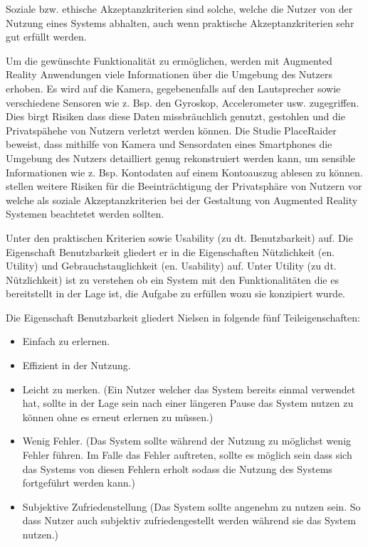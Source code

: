 Soziale bzw. ethische Akzeptanzkriterien sind solche, welche die Nutzer von der Nutzung eines Systems abhalten, auch wenn praktische Akzeptanzkriterien sehr gut erfüllt werden. 

Um die gewünschte Funktionalität zu ermöglichen, werden mit Augmented Reality Anwendungen viele Informationen über die Umgebung des Nutzers erhoben.\cite[S.~3]{Roesner2013} Es wird auf die Kamera, gegebenenfalls auf den Lautsprecher sowie verschiedene Sensoren wie z. Bsp. den Gyroskop, Accelerometer usw. zugegriffen. Dies birgt Risiken dass diese Daten missbräuchlich genutzt, gestohlen und die Privatspähehe von Nutzern verletzt werden können. \cite[S.~9]{Templeman2012} Die Studie PlaceRaider beweist, dass mithilfe von Kamera und Sensordaten eines Smartphones die Umgebung des Nutzers detailliert genug rekonstruiert werden kann, um sensible Informationen wie z. Bsp. Kontodaten auf einem Kontoauszug ablesen zu können. \cite{Roesner2013,Lebeck2018} stellen weitere Risiken für die Beeinträchtigung der Privatsphäre von Nutzern vor welche als soziale Akzeptanzkriterien bei der Gestaltung von Augmented Reality Systemen beachtetet werden sollten. 

Unter den praktischen Kriterien sowie Usability (zu dt. Benutzbarkeit) auf. Die Eigenschaft Benutzbarkeit gliedert er in die Eigenschaften Nützlichkeit (en. Utility) und Gebrauchstauglichkeit (en. Usability) auf. Unter Utility (zu dt. Nützlichkeit) ist zu verstehen ob ein System mit den Funktionalitäten die es bereitstellt in der Lage ist, die Aufgabe zu erfüllen wozu sie konzipiert wurde.

Die Eigenschaft Benutzbarkeit gliedert Nielsen in folgende fünf Teileigenschaften: 

\begin{itemize}
	\item Einfach zu erlernen.
	\item Effizient in der Nutzung.
	\item Leicht zu merken. (Ein Nutzer welcher das System bereits einmal verwendet hat, sollte in der Lage sein nach einer längeren Pause das System nutzen zu können ohne es erneut erlernen zu müssen.)
	\item Wenig Fehler. (Das System sollte während der Nutzung zu möglichst wenig Fehler führen. Im Falle das Fehler auftreten, sollte es möglich sein dass sich das Systems von diesen Fehlern erholt sodass die Nutzung des Systems fortgeführt werden kann.)
	\item Subjektive Zufriedenstellung (Das System sollte angenehm zu nutzen sein. So dass Nutzer auch subjektiv zufriedengestellt werden während sie das System nutzen.)
\end{itemize}

